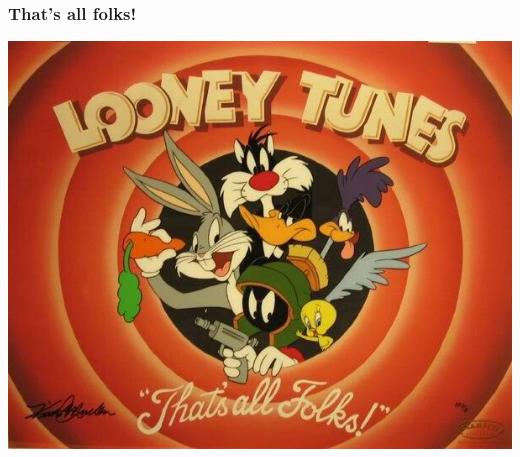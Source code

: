 \documentclass{beamer}
\begin{document}
\begin{frame}
	\frametitle{That's all folks!}
	\centering
\includegraphics[scale = 0.4]{LooneyTunes.jpg}
\end{frame}
\end{document}
